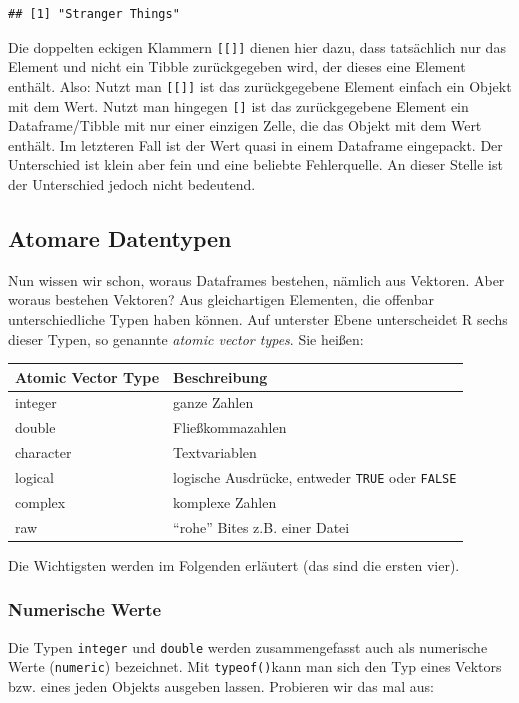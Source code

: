 \documentclass[
]{book}
\begin{document}
\begin{verbatim}
## [1] "Stranger Things"
\end{verbatim}

Die doppelten eckigen Klammern \texttt{{[}{[}{]}{]}} dienen hier dazu, dass tatsächlich nur das Element und nicht ein Tibble zurückgegeben wird, der dieses eine Element enthält. Also: Nutzt man \texttt{{[}{[}{]}{]}} ist das zurückgegebene Element einfach ein Objekt mit dem Wert. Nutzt man hingegen \texttt{{[}{]}} ist das zurückgegebene Element ein Dataframe/Tibble mit nur einer einzigen Zelle, die das Objekt mit dem Wert enthält. Im letzteren Fall ist der Wert quasi in einem Dataframe eingepackt. Der Unterschied ist klein aber fein und eine beliebte Fehlerquelle. An dieser Stelle ist der Unterschied jedoch nicht bedeutend.

\hypertarget{atomic_vector_types}{%
\subsection{Atomare Datentypen}\label{atomic_vector_types}}

Nun wissen wir schon, woraus Dataframes bestehen, nämlich aus Vektoren. Aber woraus bestehen Vektoren? Aus gleichartigen Elementen, die offenbar unterschiedliche Typen haben können. Auf unterster Ebene unterscheidet R sechs dieser Typen, so genannte \emph{atomic vector types}. Sie heißen:

\begin{longtable}[]{@{}ll@{}}
\toprule
Atomic Vector Type & Beschreibung\tabularnewline
\midrule
\endhead
integer & ganze Zahlen\tabularnewline
double & Fließkommazahlen\tabularnewline
character & Textvariablen\tabularnewline
logical & logische Ausdrücke, entweder \texttt{TRUE} oder \texttt{FALSE}\tabularnewline
complex & komplexe Zahlen\tabularnewline
raw & ``rohe'' Bites z.B. einer Datei\tabularnewline
\bottomrule
\end{longtable}

Die Wichtigsten werden im Folgenden erläutert (das sind die ersten vier).

\hypertarget{numerische-werte}{%
\subsubsection{Numerische Werte}\label{numerische-werte}}

Die Typen \texttt{integer} und \texttt{double} werden zusammengefasst auch als numerische Werte (\texttt{numeric}) bezeichnet. Mit \texttt{typeof()}kann man sich den Typ eines Vektors bzw. eines jeden Objekts ausgeben lassen. Probieren wir das mal aus:
\end{document}

